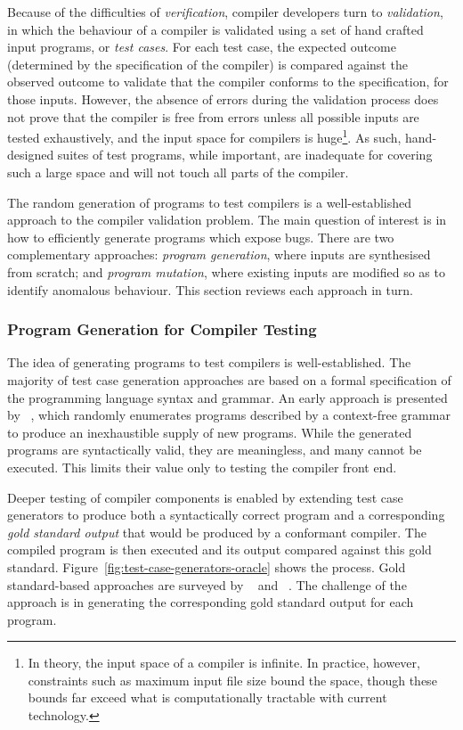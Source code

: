 Because of the difficulties of \emph{verification}, compiler developers turn to \emph{validation}, in which the behaviour of a compiler is validated using a set of hand crafted input programs, or \emph{test cases}. For each test case, the expected outcome (determined by the specification of the compiler) is compared against the observed outcome to validate that the compiler conforms to the specification, for those inputs. However, the absence of errors during the validation process does not prove that the compiler is free from errors unless all possible inputs are tested exhaustively, and the input space for compilers is huge\footnote{In theory, the input space of a compiler is infinite. In practice, however, constraints such as maximum input file size bound the space, though these bounds far exceed what is computationally tractable with current technology.}. As such, hand-designed suites of test programs, while important, are inadequate for covering such a large space and will not touch all parts of the compiler.

The random generation of programs to test compilers is a well-established approach to the compiler validation problem. The main question of interest is in how to efficiently generate programs which expose bugs. There are two complementary approaches: \emph{program generation}, where inputs are synthesised from scratch; and \emph{program mutation}, where existing inputs are modified so as to identify anomalous behaviour. This section reviews each approach in turn.


\subsubsection{Program Generation for Compiler Testing}

The idea of generating programs to test compilers is well-established. The majority of test case generation approaches are based on a formal specification of the programming language syntax and grammar. An early approach is presented by \citeauthor{Hanford1970a}~\cite{Hanford1970a}, which randomly enumerates programs described by a context-free grammar to produce an inexhaustible supply of new programs. While the generated programs are syntactically valid, they are meaningless, and many cannot be executed. This limits their value only to testing the compiler front end.

Deeper testing of compiler components is enabled by extending test case generators to produce both a syntactically correct program and a corresponding \emph{gold standard output} that would be produced by a conformant compiler. The compiled program is then executed and its output compared against this gold standard. Figure~\ref{fig:test-case-generators-oracle} shows the process. Gold standard-based approaches are surveyed by \citeauthor{Boujarwah1997}~\cite{Boujarwah1997} and \citeauthor{Kossatchev2005}~\cite{Kossatchev2005}. The challenge of the approach is in generating the corresponding gold standard output for each program.

